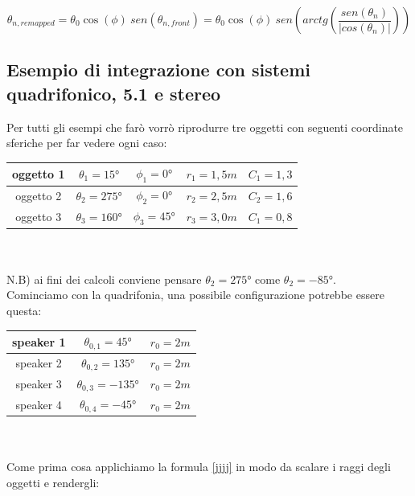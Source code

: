 \documentclass[12pt,a4paper]{report}
\begin{document}
\begin{equation}
\theta_{n, remapped}= \theta_0 \cos(\phi) \ sen (\theta_{n,front}) = \theta_0 \cos(\phi)\ sen \left( arctg  \left( \dfrac{sen(\theta_n)}{\vert cos(\theta_n)\vert } \right)\right)
\label{mmmm}
\end{equation}





\subsection{Esempio di integrazione con sistemi quadrifonico, 5.1 e stereo}

Per tutti gli esempi che farò vorrò riprodurre tre oggetti con seguenti coordinate sferiche per far vedere ogni caso:\\

\begin{tabular}{|c|c|c|c|c|}
\hline 
oggetto 1 & $\theta_1=15°$ & $\phi_1=0°$ & $r_1=1,5m$ & $C_1=1,3$ \\ 
\hline 
oggetto 2 & $\theta_2=275°$ & $\phi_2=0°$ & $r_2=2,5m$ & $C_2=1,6$ \\ 
\hline 
oggetto 3 & $\theta_3=160°$ & $\phi_3=45°$ & $r_3=3,0m$ & $C_1=0,8$ \\ 
\hline 

\end{tabular} \\ \\
 
N.B) ai fini dei calcoli conviene pensare $\theta_2=275°$ come $\theta_2=-85°$.\\

Cominciamo con la quadrifonia, una possibile configurazione potrebbe essere questa:\\

\begin{tabular}{|c|c|c|}
\hline 
speaker 1 & $\theta_{0,1}=45°$ & $r_0=2m$\\ 
\hline  
speaker 2 & $\theta_{0,2}=135°$ & $r_0=2m$\\ 
\hline 
speaker 3 & $\theta_{0,3}=-135°$ & $r_0=2m$\\ 
\hline 
speaker 4 & $\theta_{0,4}=-45°$ & $r_0=2m$\\ 
\hline 
\end{tabular} \\
\\

Come prima cosa applichiamo la formula \ref{jjjj} in modo da scalare i raggi degli oggetti e rendergli:
\end{document}
